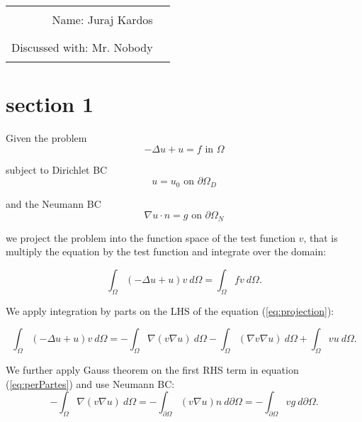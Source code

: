 \documentclass[unicode,11pt,a4paper,oneside,numbers=endperiod,openany]{scrartcl}
\begin{document}
\setassignment
{}
\newline


\begin{center}
\begin{tabular}{rc}
Name: Juraj Kardos  & \rule{5cm}{0.0pt} \\
Discussed with: Mr. Nobody & \rule{5cm}{0.0pt} 
\end{tabular}
\end{center}



\section{section 1}
Given the problem 
\begin{equation}
    -\Delta u + u = f \text{ in } \Omega
\end{equation}

subject to Dirichlet BC
\begin{equation}
    u = u_0 \text{ on } \partial \Omega_D
\end{equation}

and the Neumann BC
\begin{equation}
    \nabla u \cdot n = g \text{ on } \partial \Omega_N
\end{equation}

we project the problem into the function space of the test function $v$,
that is multiply the equation by the test function and integrate over the
domain:

\begin{equation}
    \int_{\Omega} (-\Delta u + u) v \ d\Omega = \int_{\Omega} f v \ d\Omega.
    \label{eq:projection}
\end{equation}

We apply integration by parts on the LHS of the equation (\ref{eq:projection}):

\begin{equation}
    \int_{\Omega} (-\Delta u + u) v \ d\Omega =
    - \int_{\Omega} \nabla ( v \nabla u) \ d\Omega -
    \int_{\Omega} ( \nabla v \nabla u) \ d\Omega +
    \int_{\Omega} v u \ d\Omega.
    \label{eq:perPartes}
\end{equation}

We further apply Gauss theorem on the first RHS term in equation (\ref{eq:perPartes})
and use Neumann BC:
\begin{equation}
    - \int_{\Omega} \nabla ( v \nabla u) \ d\Omega = 
    - \int_{\partial \Omega} ( v \nabla u) n \ d\partial\Omega =
    - \int_{\partial \Omega} v g \ d\partial\Omega.
    \label{eq:gauss}
\end{equation}
\end{document}
